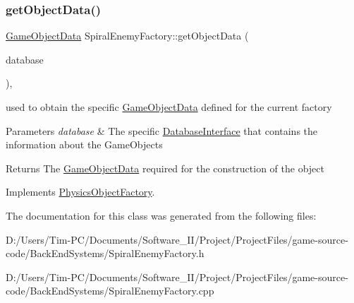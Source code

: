 \subsubsection{\texorpdfstring{get\+Object\+Data()}{getObjectData()}}
{\footnotesize\ttfamily \hyperlink{struct_game_object_data}{Game\+Object\+Data} Spiral\+Enemy\+Factory\+::get\+Object\+Data (\begin{DoxyParamCaption}\item[{const std\+::shared\+\_\+ptr$<$ \hyperlink{class_database_interface}{Database\+Interface} $>$ \&}]{database }\end{DoxyParamCaption})\hspace{0.3cm}{\ttfamily [override]}, {\ttfamily [virtual]}}



used to obtain the specific \hyperlink{struct_game_object_data}{Game\+Object\+Data} defined for the current factory 


\begin{DoxyParams}{Parameters}
{\em database} & The specific \hyperlink{class_database_interface}{Database\+Interface} that contains the information about the Game\+Objects \\
\hline
\end{DoxyParams}
\begin{DoxyReturn}{Returns}
The \hyperlink{struct_game_object_data}{Game\+Object\+Data} required for the construction of the object 
\end{DoxyReturn}


Implements \hyperlink{class_physics_object_factory_aa59f52d3adc1fac676f4a8a3c2de9ba9}{Physics\+Object\+Factory}.



The documentation for this class was generated from the following files\+:\begin{DoxyCompactItemize}
\item 
D\+:/\+Users/\+Tim-\/\+P\+C/\+Documents/\+Software\+\_\+\+I\+I/\+Project/\+Project\+Files/game-\/source-\/code/\+Back\+End\+Systems/Spiral\+Enemy\+Factory.\+h\item 
D\+:/\+Users/\+Tim-\/\+P\+C/\+Documents/\+Software\+\_\+\+I\+I/\+Project/\+Project\+Files/game-\/source-\/code/\+Back\+End\+Systems/Spiral\+Enemy\+Factory.\+cpp\end{DoxyCompactItemize}
